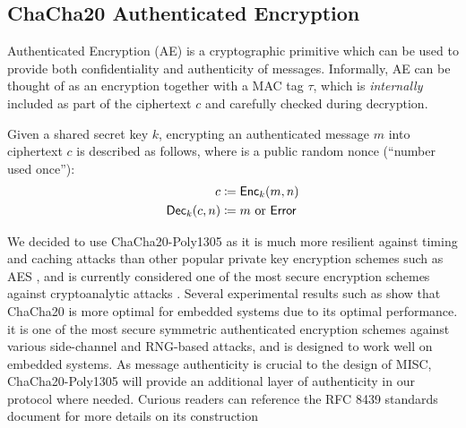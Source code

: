 
\subsection{ChaCha20 Authenticated Encryption}

Authenticated Encryption (AE) is a cryptographic primitive which can be used to provide both confidentiality and authenticity of messages. Informally, AE can be thought of as an encryption together with a MAC tag $\tau$, which is \textit{internally} included as part of the ciphertext $c$ and carefully checked during decryption.

Given a shared secret key $k$, encrypting an authenticated message $m$ into ciphertext $c$ is described as follows, where \nonce is a public random nonce (``number used once''):
\begin{align*}
c &\coloneqq \mathsf{Enc}_k(m, n) \\
\mathsf{Dec}_k(c, n) &\coloneqq m \text{ or } \mathsf{Error}
\end{align*}

We decided to use ChaCha20-Poly1305 as 
\iflong
it is much more resilient against timing and caching attacks than other popular private key encryption schemes such as AES \cite{Najm2018ChaCha20}, and is currently considered one of the most secure encryption schemes against cryptoanalytic attacks \cite{Mouha2013Salsa20}. Several experimental results such as \cite{DeStatis2017ChaCha20} show that ChaCha20 is more optimal for embedded systems due to its optimal performance.
\else
it is one of the most secure symmetric authenticated encryption schemes against various side-channel and RNG-based attacks, and is designed to work well on embedded systems.
\fi
As message authenticity is crucial to the design of MISC, ChaCha20-Poly1305 will provide an additional layer of authenticity in our protocol where needed.
Curious readers can reference the RFC 8439 standards document \cite{rfc8439} for more details on its construction

